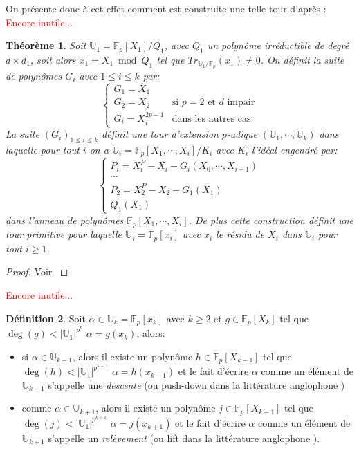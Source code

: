 \documentclass[10pt,a4paper]{book}
\theoremstyle{plain}
\newtheorem{thm}{Théorème}
\theoremstyle{definition}
\theoremstyle{definition}
\theoremstyle{definition}
\theoremstyle{definition}
\newtheorem{defi}[thm]{Définition}
\theoremstyle{remark}
\theoremstyle{remark}
\begin{document}
On présente donc à cet effet comment est construite une telle tour d'après \cite{DeFeo-Shost'12}:
\textcolor{red}{Encore inutile...}
\begin{thm}
Soit $\mathbb{U}_1=\mathbb{F}_p[X_1]/Q_1$, avec $Q_1$ un polynôme irréductible de degré $d \times d_1$, soit alors $x_1=X_1 \bmod Q_1$ tel que $Tr_{\mathbb{U}_1/\mathbb{F}_p}(x_1)\neq 0$. On définit la suite de polynômes $G_i$ avec $ 1 \leqslant i \leqslant k$ par:
\begin{equation}
\begin{cases}
G_1=X_1 & \\
G_2=X_2 & \text{si } p=2 \text{ et } d \text{ impair} \\
G_i=X_i^{2p-1} & \text{dans les autres cas.} 
\end{cases}
\end{equation}
La suite $(G_i)_{1 \leqslant i \leqslant k }$ définit une \emph{tour d'extension $p$-adique} $(\mathbb{U}_1, \cdots, \mathbb{U}_k)$ dans laquelle pour tout $i$ on a $\mathbb{U}_i=\mathbb{F}_p[X_1, \cdots, X_i]/K_i$ avec $K_i$ l'idéal engendré par:
\begin{equation}
\begin{cases}
P_i=X_i^P-X_i-G_i(X_0, \cdots,X_{i-1}) \\
\cdots \\
P_2=X_2^P-X_2-G_1(X_1)\\
Q_1(X_1)
\end{cases}
\end{equation}
dans l'anneau de polynômes $\mathbb{F}_p[X_1, \cdots, X_i]$. De plus cette construction définit une tour primitive pour laquelle $\mathbb{U}_i=\mathbb{F}_p[x_i]$ avec $x_i$ le résidu de $X_i$ dans $\mathbb{U}_i$ pour tout $i \geqslant 1$.    
\end{thm} 

\begin{proof}
Voir  \cite[Théorème 2]{DeFeo-Shost'12} 
\end{proof}
\textcolor{red}{Encore inutile...}
\begin{defi}
Soit $\alpha \in \mathbb{U}_k=\mathbb{F}_p[x_k]$ avec $k \geqslant 2$ et $g \in \mathbb{F}_p[X_k]$ tel que $\deg(g)<|\mathbb{U}_1|^{p^k}$ $\alpha=g(x_k)$, alors:
\begin{itemize} 
\item si $\alpha \in \mathbb{U}_{k-1}$, alors il existe un polynôme $h \in \mathbb{F}_p[X_{k-1}]$ tel que $\deg(h)<|\mathbb{U}_1|^{p^{k-1}}$ $\alpha=h(x_{k-1})$ et le fait d'écrire $\alpha$ comme un élément de $\mathbb{U}_{k-1}$ s'appelle une \emph{descente} (ou push-down dans la littérature anglophone \cite{DeFeo-Shost'12})
\item comme $\alpha \in \mathbb{U}_{k+1}$, alors il existe un polynôme $j \in \mathbb{F}_p[X_{k-1}]$ tel que $\deg(j)<|\mathbb{U}_1|^{p^{k+1}}$ $\alpha=j(x_{k+1})$ et le fait d'écrire $\alpha$ comme un élément de $\mathbb{U}_{k+1}$ s'appelle un \emph{relèvement} (ou lift dans la littérature anglophone \cite{DeFeo-Shost'12}).
\end{itemize}
\end{defi}
\end{document}
